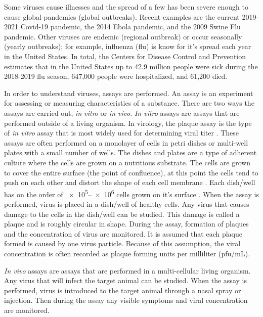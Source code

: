 Some viruses cause illnesses and the spread of a few has been severe enough to cause global pandemics (global outbreaks). Recent examples are the current 2019-2021 Covid-19 pandemic, the 2014 Ebola pandemic, and the 2009 Swine Flu pandemic. Other viruses are endemic (regional outbreak) or occur seasonally (yearly outbreaks); for example, influenza (flu) is know for it's spread each year in the United States. In total, the Centers for Disease Control and Prevention estimates that in the United States up to 42.9 million people were sick during the 2018-2019 flu season, 647,000 people were hospitalized, and 61,200 died. \citep{xu_update_2019}

In order to understand viruses, assays are performed. An assay is an experiment for assessing or measuring characteristics of a substance. There are two ways the assays are carried out, \emph{in vitro} or \emph{in vivo}. \emph{In vitro} assays are assays that are performed outside of a living organism. In virology, the plaque assay is the type of \emph{in vitro} assay that is most widely used for determining viral titer \citep{pankaj_virus_2021}.  These assays are often performed on a monolayer of cells in petri dishes or multi-well plates with a small number of wells. The dishes and plates are a type of adherent culture where the cells are grown on a nutritious substrate. The cells are grown to cover the entire surface (the point of confluence), at this point the cells tend to push on each other and distort the shape of each cell membrane \citep{bruckner_importance_2018}. Each dish/well has on the order of \numrange[range-phrase = --]{e5}{e6} cells grown on it's surface \citep{Number_of_cells_in_a_dish}. When the assay is performed, virus is placed in a dish/well of healthy cells. Any virus that causes damage to the cells in the dish/well can be studied. This damage is called a plaque and is roughly circular in shape. During the assay, formation of plaques and the concentration of virus are monitored. It is assumed that each plaque formed is caused by one virus particle. Because of this assumption, the viral concentration is often recorded as plaque forming units per milliliter (pfu/mL). 

\emph{In vivo} assays are assays that are performed in a multi-cellular living organism. Any virus that will infect the target animal can be studied. When the assay is performed, virus is introduced to the target animal through a nasal spray or injection. Then during the assay any visible symptoms and viral concentration are monitored.%

